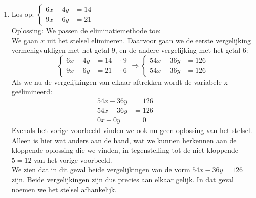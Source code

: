 \begin{enumerate}
\begin{figure}[H]
        \caption{Een strijdig stelsel}
        \label{fig:strijdig}
    \end{figure}

    De lijnen $l_1$ en $l_2$ zijn evenwijdig aan elkaar. Ze snijden elkaar dus niet, zodat er geen snijpunt is. Daarom heeft het stelsel ook geen oplossing.\\

    \item Los op: 
    $\begin{cases}
        6x-4y&=14 \\
        9x-6y&=21
    \end{cases}$ \\
    
    Oplossing: We passen de eliminatiemethode toe: \\

    We gaan $x$ uit het stelsel elimineren. Daarvoor gaan we de eerste vergelijking vermenigvuldigen met het getal 9, en de andere vergelijking met het getal 6:
    \[
    \begin{cases}
        6x-4y&=14 \quad \cdot 9\\
        9x-6y&=21 \quad \cdot 6
    \end{cases} \Rightarrow
    \begin{cases}
        54x-36y&=126 \\
        54x-36y&=126
    \end{cases}
    \]
    Als we nu de vergelijkingen van elkaar aftrekken wordt de variabele x ge\"elimineerd:
    \begin{align*}
    54x-36y&=126 \\
    54x-36y&=126 \quad -\\
    \hline 
    0x-0y&=0
    \end{align*}
    Evenals het vorige voorbeeld vinden we ook nu geen oplossing van het stelsel.
    Alleen is hier wat anders aan de hand, wat we kunnen herkennen aan de kloppende oplossing die we vinden, in tegenstelling tot de niet kloppende $5=12$ van het vorige voorbeeld. \\
    
    We zien dat in dit geval beide vergelijkingen van de vorm $54x-36y=126$ zijn. Beide vergelijkingen zijn dus precies aan elkaar gelijk. In dat geval noemen we het stelsel afhankelijk. \\


\end{enumerate}
